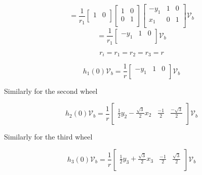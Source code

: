 \documentclass[12pt, twoside]{report}
\begin{document}
\begin{equation}
    = \frac{1}{r_1} \left[\begin{array}{cc}
            1 & 0 \\
        \end{array}\right]
    \begin{bmatrix}
        1 & 0 \\
        0 & 1 \\
    \end{bmatrix}
    \begin{bmatrix}
        -y_1 & 1 & 0 \\
        x_1  & 0 & 1 \\
    \end{bmatrix}
    \mathcal{V}_b
\end{equation}
\begin{equation}
    = \frac{1}{r_1}
    \begin{bmatrix}
        -y_1 & 1 & 0 \\
    \end{bmatrix}
    \mathcal{V}_b
\end{equation}

\begin{equation}
    r_i = r_1 = r_2 = r_3 = r
\end{equation}

\begin{equation}
    h_1(0) \mathcal{V}_b = \frac{1}{r}
    \begin{bmatrix}
        -y_1 & 1 & 0 \\
    \end{bmatrix}
    \mathcal{V}_b
\end{equation}


Similarly for the second wheel

\begin{equation}
    h_2(0) \mathcal{V}_b = \frac{1}{r}
    \begin{bmatrix}
        \frac{1}{2}y_2 - \frac{\sqrt{3}}{2}x_2 & \frac{-1}{2} & \frac{- \sqrt{3}}{2} \\
    \end{bmatrix}
    \mathcal{V}_b
\end{equation}


Similarly for the third wheel

\begin{equation}
    h_3(0) \mathcal{V}_b = \frac{1}{r}
    \begin{bmatrix}
        \frac{1}{2}y_3 + \frac{\sqrt{3}}{2}x_3 & \frac{-1}{2} & \frac{ \sqrt{3}}{2} \\
    \end{bmatrix}
    \mathcal{V}_b
\end{equation}
\end{document}
